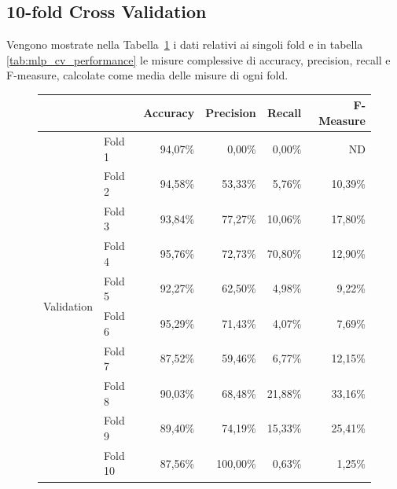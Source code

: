 \subsection{10-fold Cross Validation}

Vengono mostrate nella Tabella~\ref{tab:mlp_cv_fold_performance} i dati 
relativi ai singoli fold e in tabella \ref{tab:mlp_cv_performance} le misure 
complessive di accuracy, precision, recall e F-measure, calcolate come media 
delle misure di ogni fold. 

\begin{figure}[H]
	\centering
	\begin{tabular}{llrrrr}
		\toprule
		&& \textbf{Accuracy} & \textbf{Precision} & \textbf{Recall} & 
		\textbf{F-Measure}  \\
		\midrule
		\multirow{10}{*}{Validation} 
				& Fold 1  & 94,07\% &   0,00\% &  0,00\% &    ND   \\
				& Fold 2  & 94,58\% &  53,33\% &  5,76\% & 10,39\% \\
				& Fold 3  & 93,84\% &  77,27\% & 10,06\% & 17,80\% \\
				& Fold 4  & 95,76\% &  72,73\% & 70,80\% & 12,90\% \\
				& Fold 5  & 92,27\% &  62,50\% &  4,98\% &  9,22\% \\
				& Fold 6  & 95,29\% &  71,43\% &  4,07\% &  7,69\% \\
				& Fold 7  & 87,52\% &  59,46\% &  6,77\% & 12,15\% \\
				& Fold 8  & 90,03\% &  68,48\% & 21,88\% & 33,16\% \\
				& Fold 9  & 89,40\% &  74,19\% & 15,33\% & 25,41\% \\
				& Fold 10 & 87,56\% & 100,00\% &  0,63\% &  1,25\% \\
		\bottomrule 
	\end{tabular}
	\label{tab:mlp_cv_fold_performance}
\end{figure}

